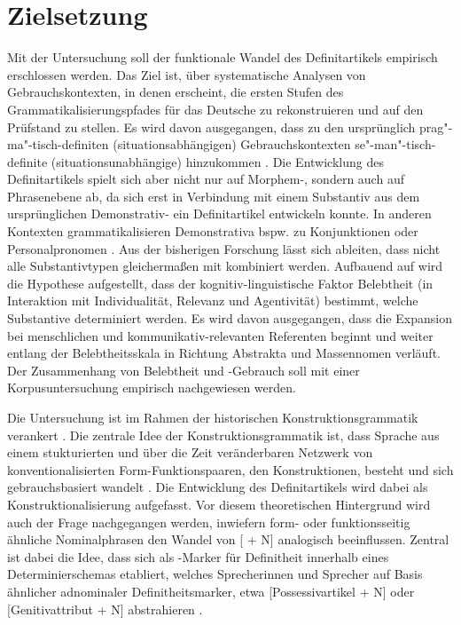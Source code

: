 \section{Zielsetzung} 
Mit der Untersuchung soll der funktionale Wandel des Definitartikels empirisch erschlossen werden. Das Ziel ist, über systematische Analysen von Gebrauchskontexten, in denen  erscheint, die ersten Stufen des Grammatikalisierungspfades \parencite{Lehmann2015} für das Deutsche zu rekonstruieren und auf den Prüfstand zu stellen. Es wird davon ausgegangen, dass zu den ursprünglich prag"-ma"-tisch-definiten (situationsabhängigen) Gebrauchskontexten se"-man"-tisch-definite (situationsunabhängige) hinzukommen \parencite{Lobner1985,Himmelmann1997}. 
Die Entwicklung des Definitartikels spielt sich aber nicht nur auf  Morphem-, sondern auch auf Phrasenebene ab, da sich erst in Verbindung mit einem Substantiv aus dem ursprünglichen Demonstrativ- ein Definitartikel entwickeln konnte. In anderen Kontexten grammatikalisieren Demonstrativa bspw. zu Konjunktionen oder Personalpronomen \parencite{Diessel1999}. Aus der bisherigen Forschung \parencite[u.a.][]{Oubouzar1989,Oubouzar1992}
lässt sich ableiten, dass nicht alle Substantivtypen gleichermaßen mit  kombiniert werden. Aufbauend auf \textcite{Szczepaniak2011a,Enger2011} wird die Hypothese aufgestellt, dass der kognitiv-linguistische Faktor Belebtheit (in Interaktion mit Individualität, Relevanz und Agentivität) bestimmt, welche Substantive determiniert werden. Es wird davon ausgegangen, dass die Expansion bei menschlichen und kommunikativ-relevanten Referenten beginnt und weiter entlang der Belebtheitsskala in Richtung Abstrakta und Massennomen verläuft. Der Zusammenhang von Belebtheit und -Gebrauch soll mit einer Korpusuntersuchung empirisch nachgewiesen werden.  

Die Untersuchung ist im Rahmen der historischen Konstruktionsgrammatik verankert \parencite[s. u.a.][]{Traugott2003,Bergs2008,Traugott2013}. Die zentrale Idee der Konstruktionsgrammatik ist, dass Sprache aus einem stukturierten und über die Zeit veränderbaren Netzwerk von konventionalisierten Form-Funktionspaaren, den Konstruktionen, besteht und sich gebrauchsbasiert wandelt \parencite{Bybee2010,Bybee2013}. Die Entwicklung des Definitartikels wird dabei als Konstruktionalisierung aufgefasst. Vor diesem theoretischen Hintergrund wird auch der Frage nachgegangen werden, inwiefern form- oder funktionsseitig ähnliche Nominalphrasen den Wandel von [ + N] analogisch beeinflussen. Zentral ist dabei die Idee, dass sich  als -Marker für Definitheit innerhalb eines Determinierschemas etabliert, welches Sprecherinnen und Sprecher auf Basis ähnlicher adnominaler Definitheitsmarker, etwa  [Possessivartikel + N]  oder [Genitivattribut + N] abstrahieren \parencite[vgl. fürs Englische][]{Sommerer2015}.


